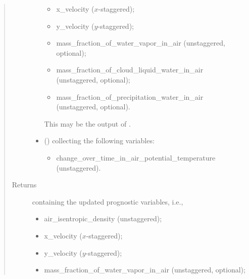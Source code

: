 \documentclass[letterpaper,10pt,english]{sphinxmanual}
\begin{document}
\begin{fulllineitems}
\begin{fulllineitems}
\begin{quote}
\begin{description}
\begin{itemize}
\begin{itemize}
\item {} 
x\_velocity (\(x\)-staggered);

\item {} 
y\_velocity (\(y\)-staggered);

\item {} 
mass\_fraction\_of\_water\_vapor\_in\_air (unstaggered, optional);

\item {} 
mass\_fraction\_of\_cloud\_liquid\_water\_in\_air (unstaggered, optional);

\item {} 
mass\_fraction\_of\_precipitation\_water\_in\_air (unstaggered, optional).

\end{itemize}

This may be the output of
{\hyperref[\detokenize{api:dycore.prognostic_isentropic_nonconservative.PrognosticIsentropicNonconservative.step_neglecting_vertical_advection}]{}}.


\item {} 
 () \textendash{} 
{\hyperref[\detokenize{api:storages.grid_data.GridData}]{}} collecting the following variables:
\begin{itemize}
\item {} 
change\_over\_time\_in\_air\_potential\_temperature (unstaggered).

\end{itemize}


\end{itemize}

\item[{Returns}] \leavevmode

{\hyperref[\detokenize{api:storages.state_isentropic.StateIsentropic}]{}} containing the updated prognostic variables, i.e.,
\begin{itemize}
\item {} 
air\_isentropic\_density (unstaggered);

\item {} 
x\_velocity (\(x\)-staggered);

\item {} 
y\_velocity (\(y\)-staggered);

\item {} 
mass\_fraction\_of\_water\_vapor\_in\_air (unstaggered, optional);


\end{itemize}
\end{description}
\end{quote}
\end{fulllineitems}
\end{fulllineitems}
\end{document}
